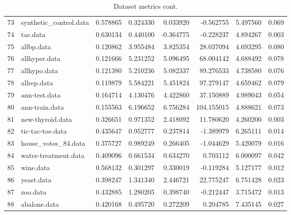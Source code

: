 \begin{table}
{\begin{tabular}{llrrrrrr}
73 &                   synthetic\_control.data &       0.578865 &               0.324330 &   0.033920 &   -0.562755 &  5.497560 &        0.069 \\
74 &                                 tae.data &       0.630134 &               0.440100 &  -0.364775 &   -0.228237 &  4.894267 &        0.003 \\
75 &                               allbp.data &       0.120862 &               3.955484 &   3.825354 &   28.037094 &  4.693295 &        0.080 \\
76 &                            allhyper.data &       0.121666 &               5.231252 &   5.096495 &   68.004142 &  4.688492 &        0.078 \\
77 &                             allhypo.data &       0.121380 &               5.210236 &   5.082337 &   89.276533 &  4.738580 &        0.076 \\
78 &                              allrep.data &       0.119879 &               5.584221 &   5.451824 &   97.279147 &  4.659462 &        0.079 \\
79 &                            ann-test.data &       0.164714 &               4.130476 &   4.422860 &   37.150889 &  4.989043 &        0.054 \\
80 &                           ann-train.data &       0.155563 &               6.196652 &   6.756284 &  104.155015 &  4.888621 &        0.073 \\
81 &                         new-thyroid.data &       0.326651 &               0.971352 &   2.418092 &   11.780620 &  4.260200 &        0.003 \\
82 &                         tic-tac-toe.data &       0.435647 &               0.952777 &   0.237814 &   -1.389979 &  6.265111 &        0.014 \\
83 &                      house\_votes\_84.data &       0.375727 &               0.989249 &   0.266405 &   -1.044629 &  5.420079 &        0.016 \\
84 &                     water-treatment.data &       0.409096 &               0.661534 &   0.634270 &    0.703112 &  6.000097 &        0.042 \\
85 &                                wine.data &       0.568132 &               0.301297 &   0.330019 &   -0.119284 &  5.127177 &        0.012 \\
86 &                               yeast.data &       0.398247 &               1.341340 &   2.446721 &   22.775247 &  6.751428 &        0.023 \\
87 &                                 zoo.data &       0.432885 &               1.280205 &   0.398740 &   -0.212447 &  3.715472 &        0.013 \\
88  &                             abalone.data &       0.420168 &               0.495720 &   0.272209 &    0.204785 &  7.435145 &        0.027 \\
\bottomrule
\end{tabular}}
\caption{Dataset metrics cont.}
\end{table}
